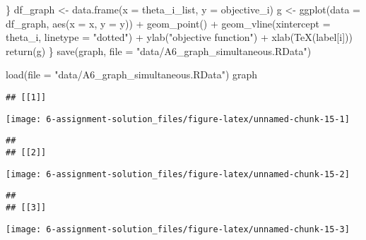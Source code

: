 \documentclass[
]{article}
\newenvironment{Shaded}{\begin{snugshade}}{\end{snugshade}}
\newcommand{\AttributeTok}[1]{\textcolor[rgb]{0.77,0.63,0.00}{#1}}
\newcommand{\FunctionTok}[1]{\textcolor[rgb]{0.00,0.00,0.00}{#1}}
\newcommand{\NormalTok}[1]{#1}
\newcommand{\OtherTok}[1]{\textcolor[rgb]{0.56,0.35,0.01}{#1}}
\newcommand{\SpecialCharTok}[1]{\textcolor[rgb]{0.00,0.00,0.00}{#1}}
\newcommand{\StringTok}[1]{\textcolor[rgb]{0.31,0.60,0.02}{#1}}
\begin{document}
\begin{Shaded}
\begin{Highlighting}[]
\NormalTok{             \}}
\NormalTok{  df\_graph }\OtherTok{\textless{}{-}} \FunctionTok{data.frame}\NormalTok{(}\AttributeTok{x =}\NormalTok{ theta\_i\_list, }\AttributeTok{y =}\NormalTok{ objective\_i) }
\NormalTok{  g }\OtherTok{\textless{}{-}} \FunctionTok{ggplot}\NormalTok{(}\AttributeTok{data =}\NormalTok{ df\_graph, }\FunctionTok{aes}\NormalTok{(}\AttributeTok{x =}\NormalTok{ x, }\AttributeTok{y =}\NormalTok{ y)) }\SpecialCharTok{+} 
    \FunctionTok{geom\_point}\NormalTok{() }\SpecialCharTok{+}
    \FunctionTok{geom\_vline}\NormalTok{(}\AttributeTok{xintercept =}\NormalTok{ theta\_i, }\AttributeTok{linetype =} \StringTok{"dotted"}\NormalTok{) }\SpecialCharTok{+}
    \FunctionTok{ylab}\NormalTok{(}\StringTok{"objective function"}\NormalTok{) }\SpecialCharTok{+} \FunctionTok{xlab}\NormalTok{(}\FunctionTok{TeX}\NormalTok{(label[i]))}
  \FunctionTok{return}\NormalTok{(g)}
\NormalTok{\}}
\FunctionTok{save}\NormalTok{(graph, }\AttributeTok{file =} \StringTok{"data/A6\_graph\_simultaneous.RData"}\NormalTok{)}
\end{Highlighting}
\end{Shaded}

\begin{Shaded}
\begin{Highlighting}[]
\FunctionTok{load}\NormalTok{(}\AttributeTok{file =} \StringTok{"data/A6\_graph\_simultaneous.RData"}\NormalTok{)}
\NormalTok{graph}
\end{Highlighting}
\end{Shaded}

\begin{verbatim}
## [[1]]
\end{verbatim}

\begin{center}\texttt{[image: 6-assignment-solution\_files/figure-latex/unnamed-chunk-15-1]} \end{center}

\begin{verbatim}
## 
## [[2]]
\end{verbatim}

\begin{center}\texttt{[image: 6-assignment-solution\_files/figure-latex/unnamed-chunk-15-2]} \end{center}

\begin{verbatim}
## 
## [[3]]
\end{verbatim}

\begin{center}\texttt{[image: 6-assignment-solution\_files/figure-latex/unnamed-chunk-15-3]} \end{center}
\end{document}

